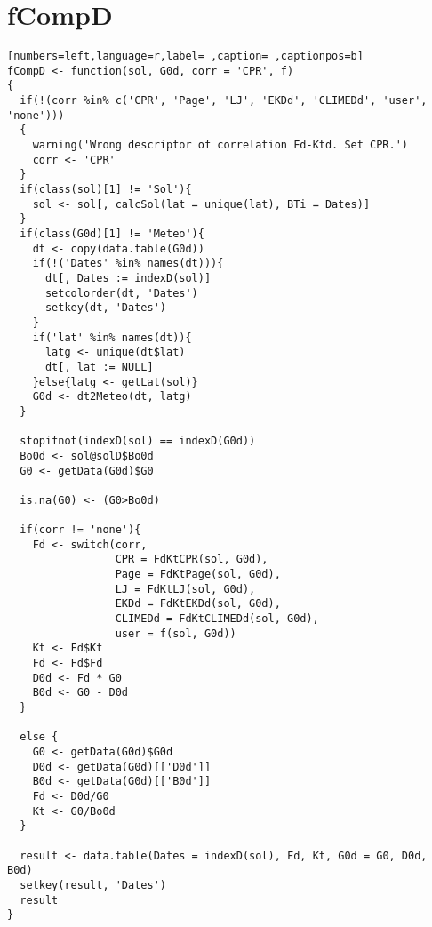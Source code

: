 \section{fCompD}
\label{sec:orga8b9e9e}
\begin{lstlisting}[numbers=left,language=r,label= ,caption= ,captionpos=b]
fCompD <- function(sol, G0d, corr = 'CPR', f)
{
  if(!(corr %in% c('CPR', 'Page', 'LJ', 'EKDd', 'CLIMEDd', 'user', 'none')))
  {
    warning('Wrong descriptor of correlation Fd-Ktd. Set CPR.')
    corr <- 'CPR'
  }
  if(class(sol)[1] != 'Sol'){
    sol <- sol[, calcSol(lat = unique(lat), BTi = Dates)]
  }
  if(class(G0d)[1] != 'Meteo'){
    dt <- copy(data.table(G0d))
    if(!('Dates' %in% names(dt))){
      dt[, Dates := indexD(sol)]
      setcolorder(dt, 'Dates')
      setkey(dt, 'Dates')
    }
    if('lat' %in% names(dt)){
      latg <- unique(dt$lat)
      dt[, lat := NULL]
    }else{latg <- getLat(sol)}
    G0d <- dt2Meteo(dt, latg)
  }  

  stopifnot(indexD(sol) == indexD(G0d))
  Bo0d <- sol@solD$Bo0d
  G0 <- getData(G0d)$G0

  is.na(G0) <- (G0>Bo0d)

  if(corr != 'none'){
    Fd <- switch(corr,
                 CPR = FdKtCPR(sol, G0d),
                 Page = FdKtPage(sol, G0d),
                 LJ = FdKtLJ(sol, G0d),
                 EKDd = FdKtEKDd(sol, G0d),
                 CLIMEDd = FdKtCLIMEDd(sol, G0d),
                 user = f(sol, G0d))
    Kt <- Fd$Kt
    Fd <- Fd$Fd
    D0d <- Fd * G0
    B0d <- G0 - D0d
  }

  else {
    G0 <- getData(G0d)$G0d
    D0d <- getData(G0d)[['D0d']]
    B0d <- getData(G0d)[['B0d']]
    Fd <- D0d/G0
    Kt <- G0/Bo0d
  }

  result <- data.table(Dates = indexD(sol), Fd, Kt, G0d = G0, D0d, B0d)
  setkey(result, 'Dates')
  result
}
\end{lstlisting}
